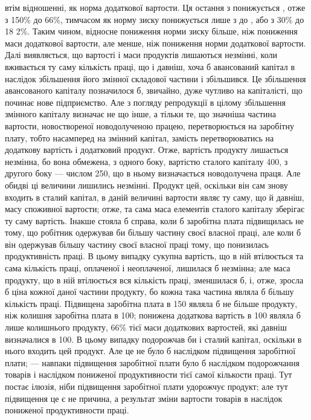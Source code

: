 \parcont{}  %
втім відношенні, як норма додаткової вартости. Ця остання з  понижується
, отже з 150\% до 66\%, тимчасом як норму зиску понижується
лише з  до , або з 30\% до 18 2\%. Таким чином, відносне пониження
норми зиску більше, ніж пониження маси додаткової вартости, але менше, ніж
пониження норми додаткової вартости. Далі виявляється, що вартості і маси продуктів
лишаються незмінні, коли вживається ту саму кількість праці, що і давніш,
хоча б авансований капітал в наслідок збільшення його змінної складової частини
і збільшився. Це збільшення авансованого капіталу позначилося б, звичайно,
дуже чутливо на капіталісті, що починає нове підприємство. Але з погляду
репродукції в цілому збільшення змінного капіталу визначає не що інше, а тільки
те, що значніша частина вартости, новоствореної новодолученою працею, перетворюється на заробітну
плату, тобто насамперед на змінний капітал, замість
перетворюватись на додаткову вартість і додатковий продукт. Отже, вартість
продукту лишається незмінна, бо вона обмежена, з одного боку, вартістю
сталого капіталу \deq{} 400, з другого боку — числом 250, що в ньому визначається
новодолучена праця. Але обидві ці величини лишились незмінні. Продукт цей,
оскільки він сам знову входить в сталий капітал, в даній величині вартости
являє ту саму, що й давніш, масу споживної вартости; отже, та сама маса
елементів сталого капіталу зберігає ту саму вартість. Інакше стояла б справа,
коли б заробітна плата підвищилась не тому, що робітник одержував би більшу
частину своєї власної праці, але коли б він одержував більшу частину своєї
власної праці тому, що понизилась продуктивність праці. В цьому випадку сукупна
вартість, що в ній втілюється та сама кількість праці, оплаченої і неоплаченої,
лишилася б незмінна; але маса продукту, що в ній втілюється вся
кількість праці, зменшилася б, і, отже, зросла б ціна кожної даної частини
продукту, бо кожна така частина являла б більшу кількість праці. Підвищена
заробітна плата в 150 являла б не більше продукту, ніж колишня заробітна
плата в 100; понижена додаткова вартість в 100 являла б лише  колишнього
продукту, 66\% тієї маси додаткових вартостей, які давніш визначалися
в 100. В цьому випадку подорожчав би і сталий капітал, оскільки в нього
входить цей продукт. Але це не було б наслідком підвищення заробітної плати;
— навпаки підвищення заробітної плати було б наслідком подорожчання
товарів і наслідком пониженої продуктивности тієї самої кількости праці. Тут
постає ілюзія, ніби підвищення заробітної плати удорожчує продукт; але тут
підвищення це є не причина, а результат зміни вартости товарів в наслідок
пониженої продуктивности праці.

